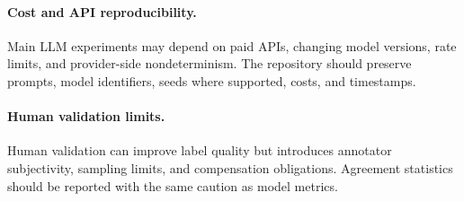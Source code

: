 \paragraph{Cost and API reproducibility.}
Main LLM experiments may depend on paid APIs, changing model versions, rate limits, and provider-side nondeterminism. The repository should preserve prompts, model identifiers, seeds where supported, costs, and timestamps.

\paragraph{Human validation limits.}
Human validation can improve label quality but introduces annotator subjectivity, sampling limits, and compensation obligations. Agreement statistics should be reported with the same caution as model metrics.
